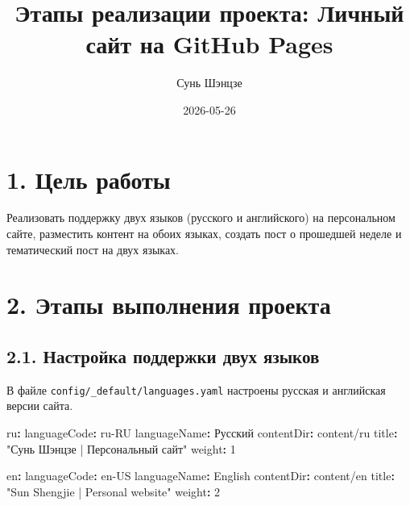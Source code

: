 \documentclass[
  russian,
]{article}
\title{Этапы реализации проекта: Личный сайт на GitHub Pages}
\author{Сунь Шэнцзе}
\date{2026-05-26}
\newenvironment{Shaded}{\begin{snugshade}}{\end{snugshade}}
\newcommand{\AttributeTok}[1]{\textcolor[rgb]{0.40,0.45,0.13}{#1}}
\newcommand{\DecValTok}[1]{\textcolor[rgb]{0.68,0.00,0.00}{#1}}
\newcommand{\FunctionTok}[1]{\textcolor[rgb]{0.28,0.35,0.67}{#1}}
\newcommand{\KeywordTok}[1]{\textcolor[rgb]{0.00,0.23,0.31}{\textbf{#1}}}
\newcommand{\StringTok}[1]{\textcolor[rgb]{0.13,0.47,0.30}{#1}}
\begin{document}
\maketitle


\section{1. Цель
работы}\label{ux446ux435ux43bux44c-ux440ux430ux431ux43eux442ux44b}

Реализовать поддержку двух языков (русского и английского) на
персональном сайте, разместить контент на обоих языках, создать пост о
прошедшей неделе и тематический пост на двух языках.

\section{2. Этапы выполнения
проекта}\label{ux44dux442ux430ux43fux44b-ux432ux44bux43fux43eux43bux43dux435ux43dux438ux44f-ux43fux440ux43eux435ux43aux442ux430}

\subsection{2.1. Настройка поддержки двух
языков}\label{ux43dux430ux441ux442ux440ux43eux439ux43aux430-ux43fux43eux434ux434ux435ux440ux436ux43aux438-ux434ux432ux443ux445-ux44fux437ux44bux43aux43eux432}

В файле \texttt{config/\_default/languages.yaml} настроены русская и
английская версии сайта.

\begin{Shaded}
\begin{Highlighting}[]
\FunctionTok{ru}\KeywordTok{:}
\AttributeTok{  }\FunctionTok{languageCode}\KeywordTok{:}\AttributeTok{ ru{-}RU}
\AttributeTok{  }\FunctionTok{languageName}\KeywordTok{:}\AttributeTok{ Русский}
\AttributeTok{  }\FunctionTok{contentDir}\KeywordTok{:}\AttributeTok{ content/ru}
\AttributeTok{  }\FunctionTok{title}\KeywordTok{:}\AttributeTok{ }\StringTok{"Сунь Шэнцзе | Персональный сайт"}
\AttributeTok{  }\FunctionTok{weight}\KeywordTok{:}\AttributeTok{ }\DecValTok{1}

\FunctionTok{en}\KeywordTok{:}
\AttributeTok{  }\FunctionTok{languageCode}\KeywordTok{:}\AttributeTok{ en{-}US}
\AttributeTok{  }\FunctionTok{languageName}\KeywordTok{:}\AttributeTok{ English}
\AttributeTok{  }\FunctionTok{contentDir}\KeywordTok{:}\AttributeTok{ content/en}
\AttributeTok{  }\FunctionTok{title}\KeywordTok{:}\AttributeTok{ }\StringTok{"Sun Shengjie | Personal website"}
\AttributeTok{  }\FunctionTok{weight}\KeywordTok{:}\AttributeTok{ }\DecValTok{2}
\end{Highlighting}
\end{Shaded}
\end{document}
